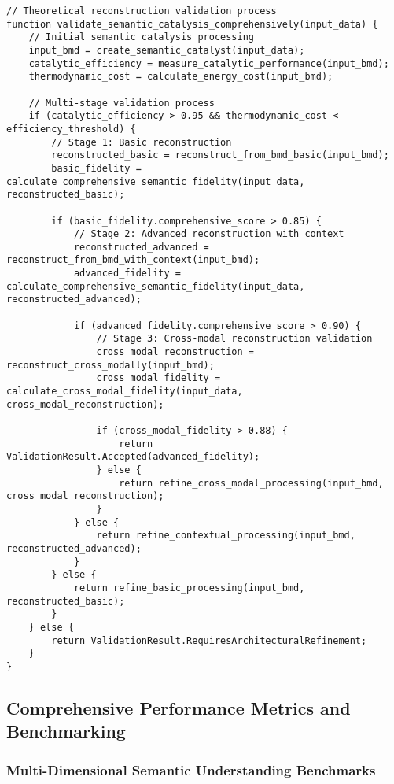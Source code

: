 \documentclass[12pt,a4paper,twoside]{article}
\begin{document}
\begin{lstlisting}[caption=Comprehensive Reconstruction Validation Algorithm]
// Theoretical reconstruction validation process
function validate_semantic_catalysis_comprehensively(input_data) {
    // Initial semantic catalysis processing
    input_bmd = create_semantic_catalyst(input_data);
    catalytic_efficiency = measure_catalytic_performance(input_bmd);
    thermodynamic_cost = calculate_energy_cost(input_bmd);

    // Multi-stage validation process
    if (catalytic_efficiency > 0.95 && thermodynamic_cost < efficiency_threshold) {
        // Stage 1: Basic reconstruction
        reconstructed_basic = reconstruct_from_bmd_basic(input_bmd);
        basic_fidelity = calculate_comprehensive_semantic_fidelity(input_data, reconstructed_basic);

        if (basic_fidelity.comprehensive_score > 0.85) {
            // Stage 2: Advanced reconstruction with context
            reconstructed_advanced = reconstruct_from_bmd_with_context(input_bmd);
            advanced_fidelity = calculate_comprehensive_semantic_fidelity(input_data, reconstructed_advanced);

            if (advanced_fidelity.comprehensive_score > 0.90) {
                // Stage 3: Cross-modal reconstruction validation
                cross_modal_reconstruction = reconstruct_cross_modally(input_bmd);
                cross_modal_fidelity = calculate_cross_modal_fidelity(input_data, cross_modal_reconstruction);

                if (cross_modal_fidelity > 0.88) {
                    return ValidationResult.Accepted(advanced_fidelity);
                } else {
                    return refine_cross_modal_processing(input_bmd, cross_modal_reconstruction);
                }
            } else {
                return refine_contextual_processing(input_bmd, reconstructed_advanced);
            }
        } else {
            return refine_basic_processing(input_bmd, reconstructed_basic);
        }
    } else {
        return ValidationResult.RequiresArchitecturalRefinement;
    }
}
\end{lstlisting}

\subsection{Comprehensive Performance Metrics and Benchmarking}

\subsubsection{Multi-Dimensional Semantic Understanding Benchmarks}
\end{document}
